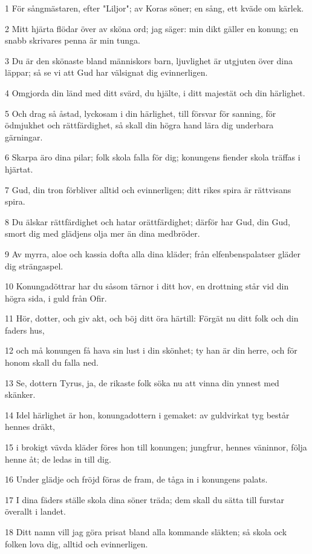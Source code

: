 \par 1 För sångmästaren, efter "Liljor"; av Koras söner; en sång, ett kväde om kärlek.
\par 2 Mitt hjärta flödar över av sköna ord; jag säger: min dikt gäller en konung; en snabb skrivares penna är min tunga.
\par 3 Du är den skönaste bland människors barn, ljuvlighet är utgjuten över dina läppar; så se vi att Gud har välsignat dig evinnerligen.
\par 4 Omgjorda din länd med ditt svärd, du hjälte, i ditt majestät och din härlighet.
\par 5 Och drag så åstad, lyckosam i din härlighet, till försvar för sanning, för ödmjukhet och rättfärdighet, så skall din högra hand lära dig underbara gärningar.
\par 6 Skarpa äro dina pilar; folk skola falla för dig; konungens fiender skola träffas i hjärtat.
\par 7 Gud, din tron förbliver alltid och evinnerligen; ditt rikes spira är rättvisans spira.
\par 8 Du älskar rättfärdighet och hatar orättfärdighet; därför har Gud, din Gud, smort dig med glädjens olja mer än dina medbröder.
\par 9 Av myrra, aloe och kassia dofta alla dina kläder; från elfenbenspalatser gläder dig strängaspel.
\par 10 Konungadöttrar har du såsom tärnor i ditt hov, en drottning står vid din högra sida, i guld från Ofir.
\par 11 Hör, dotter, och giv akt, och böj ditt öra härtill: Förgät nu ditt folk och din faders hus,
\par 12 och må konungen få hava sin lust i din skönhet; ty han är din herre, och för honom skall du falla ned.
\par 13 Se, dottern Tyrus, ja, de rikaste folk söka nu att vinna din ynnest med skänker.
\par 14 Idel härlighet är hon, konungadottern i gemaket: av guldvirkat tyg består hennes dräkt,
\par 15 i brokigt vävda kläder föres hon till konungen; jungfrur, hennes väninnor, följa henne åt; de ledas in till dig.
\par 16 Under glädje och fröjd föras de fram, de tåga in i konungens palats.
\par 17 I dina fäders ställe skola dina söner träda; dem skall du sätta till furstar överallt i landet.
\par 18 Ditt namn vill jag göra prisat bland alla kommande släkten; så skola ock folken lova dig, alltid och evinnerligen.

